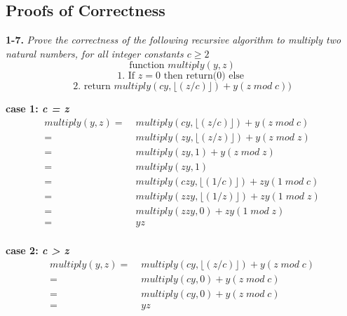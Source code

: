 \subsection*{Proofs of Correctness}

\textbf{1-7.} \emph{Prove the correctness of the following recursive algorithm to multiply two
natural numbers, for all integer constants $c\geq 2$} 
   $$\text{function } multiply(y,z)$$ 
   $$\text{1. If  } z = 0 \text{ then return(0) else }$$ 
   $$\text{2. return } multiply(cy, \lfloor(z/c)\rfloor) + y(z \;mod\; c))$$

\begin{minipage}{0.95\textwidth}

\textbf{case 1: \emph{c = z}}
\begin{align*}
multiply(y,z) =& \;multiply(cy, \lfloor(z/c)\rfloor) + y(z \;mod\; c) \\
			  =& \;multiply(zy, \lfloor(z/z)\rfloor) + y(z \;mod\; z) \\
			  =& \;multiply(zy, 1) + y(z\; mod\; z) \\
			  =& \;multiply(zy, 1) \\ 
			  =& \;multiply(czy, \lfloor(1/c)\rfloor) + zy(1 \;mod\; c) \\ 
			  =& \;multiply(zzy, \lfloor(1/z)\rfloor) + zy(1 \;mod\; z) \\ 
			  =& \;multiply(zzy, 0) + zy(1 \;mod\; z) \\ 
			  =& \;yz \\
\end{align*}
\end{minipage}

\begin{minipage}{0.95\textwidth}
\textbf{case 2: \emph{c > z}}
\begin{align*}
multiply(y,z) =& \;multiply(cy, \lfloor(z/c)\rfloor) + y(z \;mod\; c) \\
			  =& \;multiply(cy, 0) + y(z \;mod\; c) \\
			  =& \;multiply(cy, 0) + y(z \;mod\; c) \\
			  =& \;yz \\
\end{align*}
\end{minipage}

